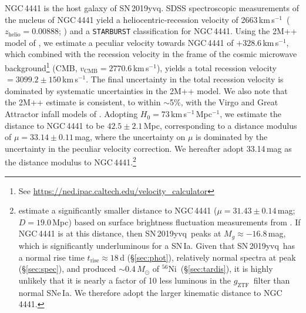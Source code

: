 \documentclass[twocolumn]{aastex63}
\newcommand{\fromkate}[1]{{\color{brown} fromKM: {#1}}}
\newcommand{\todo}[1]{{\color{magenta} to-do: {#1}}}
\newcommand{\gztf}{$g_\mathrm{ZTF}$}
\newcommand{\kms}{km\,s$^{-1}$}
\newcommand{\radni}{$^{56}$Ni}
\newcommand{\sn}{SN\,2019yvq}
\begin{document}
NGC\,4441 is the host galaxy of \sn. SDSS spectroscopic measurements of the
nucleus of NGC\,4441 yield a heliocentric-recession velocity of 2663\,\kms\
($z_\mathrm{helio} = 0.00888$; \citealt{Abolfathi18}) and a
\texttt{STARBURST} classification for NGC\,4441. Using the 2M++ model of
\citet{Carrick15}, we estimate a peculiar velocity towards NGC\,4441 of
$+328.6$\,\kms, which combined with the recession velocity in the frame of
the cosmic microwave background\footnote{See
\url{https://ned.ipac.caltech.edu/velocity_calculator}} (CMB,
$v_\mathrm{CMB} = 2770.6$\,\kms), yields a total recession velocity $=
3099.2 \pm 150$\,\kms. The final uncertainty in the total recession velocity
is dominated by systematic uncertainties in the 2M++ model. We also note
that the 2M++ estimate is consistent, to within $\sim$5\%, with the Virgo
and Great Attractor infall models of \citet{Mould00}. Adopting $H_0 =
73$\,\kms\,Mpc$^{-1}$, we estimate the distance to NGC\,4441 to be $42.5 \pm
2.1$\,Mpc, corresponding to a distance modulus of $\mu = 33.14 \pm
0.11$\,mag, where the uncertainty on $\mu$ is dominated by the uncertainty
in the peculiar velocity correction. We hereafter adopt 33.14\,mag as the
distance modulus to NGC\,4441.\footnote{\citet{Tully13} estimate a
significantly smaller distance to NGC\,4441 ($\mu = 31.43 \pm 0.14$\,mag; $D
= 19.0$\,Mpc) based on surface brightness fluctuation measurements from
\citet{Tonry01}. If NGC\,4441 is at this distance, then \sn\ peaks at $M_g
\approx -16.8$\,mag, which is significantly underluminous for a SN\,Ia.
Given that \sn\ has a normal rise time $t_\mathrm{rise} \approx 18$\,d
(\S\ref{sec:phot}), relatively normal spectra at peak (\S\ref{sec:spec}),
and produced $\sim$0.4\,$M_\odot$ of \radni\ (\S\ref{sec:tardis}), it is
highly unlikely that it is nearly a factor of 10 less luminous in the \gztf\
filter than normal SNe\,Ia. We therefore adopt the larger kinematic distance
to NGC\,4441.}
\end{document}
